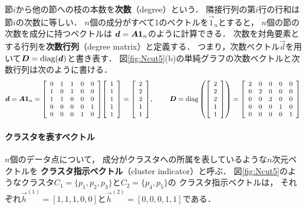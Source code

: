 節$i$から他の節への枝の本数を{\bf 次数}（degree）という．
隣接行列の第$i$行の行和は節$i$の次数に等しい．
$n$個の成分がすべて1のベクトルを$\vec 1_n$とすると，
$n$個の節の次数を成分に持つベクトルは
$\vec d=\mtr A\vec 1_n$のように計算できる．
次数を対角要素とする行列を{\bf 次数行列}（degree matrix）と定義する．
つまり，次数ベクトル$\vec d$を用いて$\mtr D=\diag(\vec d)$と書き表す．
図\ref{fig:Ncut5}(b)の単純グラフの次数ベクトルと次数行列は次のように書ける．
\begin{equation}
 \vec d=\mtr A\vec 1_n
=\smatrix{\small}{ccccc}
{
0 & 1 & 1 & 0 & 0\\
1 & 0 & 1 & 0 & 0\\
1 & 1 & 0 & 0 & 0\\
0 & 0 & 0 & 0 & 1\\
0 & 0 & 0 & 1 & 0}
\smatrix{\small}{c}{1\\ 1\\ 1\\ 1\\ 1}
=\smatrix{\small}{c}{2\\ 2\\ 2\\ 1\\ 1},
\quad \mbox{ }\quad
\mtr D=\diag\left(
\smatrix{\small}{c}{2\\ 2\\ 2\\ 1\\ 1}
\right)
=\smatrix{\small}{ccccc}
{
2 & 0 & 0 & 0 & 0\\
0 & 2 & 0 & 0 & 0\\
0 & 0 & 2 & 0 & 0\\
0 & 0 & 0 & 1 & 0\\
0 & 0 & 0 & 0 & 1}
\end{equation}


\paragraph{クラスタを表すベクトル}
$n$個のデータ点について，
成分がクラスタへの所属を表しているような$n$次元ベクトルを
{\bf クラスタ指示ベクトル}（cluster indicator）と呼ぶ．
図\ref{fig:Ncut5}のようなクラスタ$C_1=\{p_1,p_2,p_3\}$と$C_2=\{p_4,p_5\}$の
クラスタ指示ベクトルは，
それぞれ$\vec h^{(1)}=[1,1,1,0,0]$と$\vec h^{(2)}=[0,0,0,1,1]$である．

